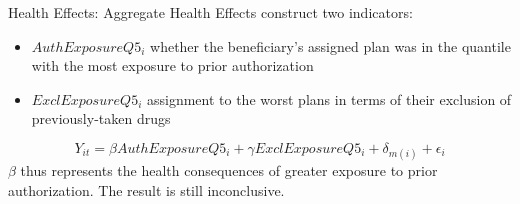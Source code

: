 \begin{frame}{Health Effects: Aggregate Health Effects}
    construct two indicators:
    \begin{itemize}
        \item $AuthExposureQ5_i$ whether the beneficiary’s assigned plan was in the quantile with the most exposure to prior authorization
        \item $ExclExposureQ5_i$ assignment to the worst plans in terms of their exclusion of previously-taken drugs
    \end{itemize}
    $$Y_{it}=\beta AuthExposureQ5_i + \gamma ExclExposureQ5_i + \delta_{m(i)} + \epsilon_{i} $$
    $\beta$ thus represents the health consequences of greater exposure to prior authorization. The result is still inconclusive.
    
\end{frame}